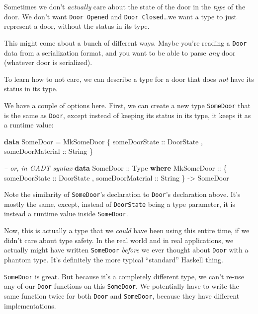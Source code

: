 \documentclass[]{article}
\newenvironment{Shaded}{}{}
\newcommand{\CommentTok}[1]{\textcolor[rgb]{0.38,0.63,0.69}{\textit{#1}}}
\newcommand{\DataTypeTok}[1]{\textcolor[rgb]{0.56,0.13,0.00}{#1}}
\newcommand{\FunctionTok}[1]{\textcolor[rgb]{0.02,0.16,0.49}{#1}}
\newcommand{\KeywordTok}[1]{\textcolor[rgb]{0.00,0.44,0.13}{\textbf{#1}}}
\newcommand{\NormalTok}[1]{#1}
\newcommand{\OtherTok}[1]{\textcolor[rgb]{0.00,0.44,0.13}{#1}}
\begin{document}
Sometimes we don't \emph{actually} care about the state of the door in the
\emph{type} of the door. We don't want \texttt{Door\ \textquotesingle{}Opened}
and \texttt{Door\ \textquotesingle{}Closed}\ldots{}we want a type to just
represent a door, without the status in its type.

This might come about a bunch of different ways. Maybe you're reading a
\texttt{Door} data from a serialization format, and you want to be able to parse
\emph{any} door (whatever door is serialized).

To learn how to not care, we can describe a type for a door that does \emph{not}
have its status in its type.

We have a couple of options here. First, we can create a new type
\texttt{SomeDoor} that is the same as \texttt{Door}, except instead of keeping
its status in its type, it keeps it as a runtime value:

\begin{Shaded}
\begin{Highlighting}[]
\KeywordTok{data} \DataTypeTok{SomeDoor} \FunctionTok{=} \DataTypeTok{MkSomeDoor}
\NormalTok{    \{}\OtherTok{ someDoorState    ::} \DataTypeTok{DoorState}
\NormalTok{    ,}\OtherTok{ someDoorMaterial ::} \DataTypeTok{String}
\NormalTok{    \}}

\CommentTok{-- or, in GADT syntax}
\KeywordTok{data} \DataTypeTok{SomeDoor}\OtherTok{ ::} \DataTypeTok{Type} \KeywordTok{where}
    \DataTypeTok{MkSomeDoor} \OtherTok{::}
\NormalTok{      \{}\OtherTok{ someDoorState    ::} \DataTypeTok{DoorState}
\NormalTok{      ,}\OtherTok{ someDoorMaterial ::} \DataTypeTok{String}
\NormalTok{      \} }\OtherTok{->} \DataTypeTok{SomeDoor}
\end{Highlighting}
\end{Shaded}

Note the similarity of \texttt{SomeDoor}'s declaration to \texttt{Door}'s
declaration above. It's mostly the same, except, instead of \texttt{DoorState}
being a type parameter, it is instead a runtime value inside \texttt{SomeDoor}.

Now, this is actually a type that we \emph{could} have been using this entire
time, if we didn't care about type safety. In the real world and in real
applications, we actually might have written \texttt{SomeDoor} \emph{before} we
ever thought about \texttt{Door} with a phantom type. It's definitely the more
typical ``standard'' Haskell thing.

\texttt{SomeDoor} is great. But because it's a completely different type, we
can't re-use any of our \texttt{Door} functions on this \texttt{SomeDoor}. We
potentially have to write the same function twice for both \texttt{Door} and
\texttt{SomeDoor}, because they have different implementations.
\end{document}
